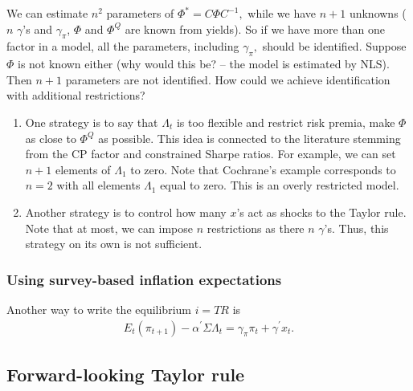 \documentclass[11pt]{article}
\begin{document}

We can estimate $n^2$ parameters of $\Phi^*=C \Phi C^{-1},$ while we have $n+1$ unknowns ($n$ $\gamma$'s and $\gamma_{\pi}$, $\Phi$ and $\Phi^Q$ are known from yields). So if we have more than one factor in a model, all the parameters, including $\gamma_{\pi},$ should be identified.  Suppose $\Phi$ is not known either (why would this be? -- the model is estimated by NLS). Then $n+1$ parameters are not identified.  How could we achieve identification with additional restrictions?
\begin{enumerate}
     \item One strategy is to say that $\Lambda_t$ is too flexible and restrict risk premia, make $\Phi$ as close to $\Phi^Q$ as possible. This idea is connected to the literature stemming from the CP factor and constrained Sharpe ratios. For example, we can set $n+1$ elements of $\Lambda_1$ to zero. Note that Cochrane's example corresponds to $n=2$ with all elements $\Lambda_1$ equal to zero. This is an overly restricted model.
     \item Another strategy is to control how many $x$'s act as shocks to the Taylor rule. Note that at most, we can impose $n$ restrictions as there $n$ $\gamma$'s. Thus, this strategy on its own is not sufficient.
     \end{enumerate}

\subsubsection*{Using survey-based inflation expectations}

Another way to write the equilibrium $i=TR$ is
\begin{eqnarray}
   E_t(\pi_{t+1}) - \alpha^{\prime} \Sigma \Lambda_t = \gamma_{\pi} \pi_t + \gamma^{\prime} x_t.
\end{eqnarray}


\subsection*{Forward-looking Taylor rule}
\end{document}
